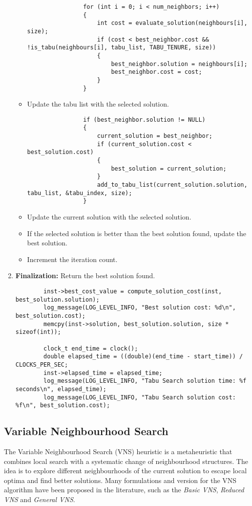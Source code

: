 \documentclass{article}
\begin{document}
\begin{enumerate}
\begin{itemize}
\begin{lstlisting}
				for (int i = 0; i < num_neighbors; i++)
				{
					int cost = evaluate_solution(neighbours[i], size);
					if (cost < best_neighbor.cost && !is_tabu(neighbours[i], tabu_list, TABU_TENURE, size))
					{
						best_neighbor.solution = neighbours[i];
						best_neighbor.cost = cost;
					}
				}
			  \end{lstlisting}
              \item Update the tabu list with the selected solution.
              \begin{lstlisting}
				if (best_neighbor.solution != NULL)
				{
					current_solution = best_neighbor;
					if (current_solution.cost < best_solution.cost)
					{
						best_solution = current_solution;
					}
					add_to_tabu_list(current_solution.solution, tabu_list, &tabu_index, size);
				}
			  \end{lstlisting}
              \item Update the current solution with the selected solution.
              \item If the selected solution is better than the best solution found, update the best solution.
              \item Increment the iteration count.
          \end{itemize}
    \item \textbf{Finalization:} Return the best solution found.
    \begin{lstlisting}
		inst->best_cost_value = compute_solution_cost(inst, best_solution.solution);
		log_message(LOG_LEVEL_INFO, "Best solution cost: %d\n", best_solution.cost);
		memcpy(inst->solution, best_solution.solution, size * sizeof(int));

		clock_t end_time = clock();
		double elapsed_time = ((double)(end_time - start_time)) / CLOCKS_PER_SEC;
		inst->elapsed_time = elapsed_time;
		log_message(LOG_LEVEL_INFO, "Tabu Search solution time: %f seconds\n", elapsed_time);
		log_message(LOG_LEVEL_INFO, "Tabu Search solution cost: %f\n", best_solution.cost);
	\end{lstlisting}
\end{enumerate}

\subsection{Variable Neighbourhood Search}
The Variable Neighbourhood Search (VNS) heuristic is a metaheuristic that combines local search with a systematic change of neighbourhood structures. 
The idea is to explore different neighbourhoods of the current solution to escape local optima and find better solutions.
Many formulations and version for the VNS algorithm have been proposed in the literature, such as the \textit{Basic VNS}, \textit{Reduced VNS} and \textit{General VNS}.\cite{VariableNeighborhood_Search}\\
\end{document}

